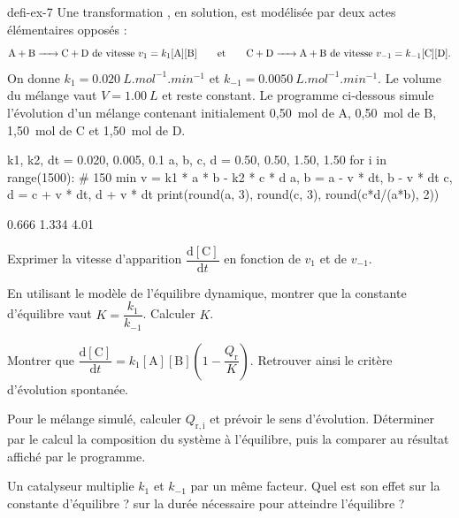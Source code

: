 \begin{blocEdition}{defi-ex-7}
Une transformation , en solution, est modélisée par deux actes élémentaires opposés :
\[\ce{A + B -> C + D}\ \text{de vitesse}\ v_1=k_1[\mathrm{A}][\mathrm{B}]\qquad\text{et}\qquad\ce{C + D -> A + B}\ \text{de vitesse}\ v_{-1}=k_{-1}[\mathrm{C}][\mathrm{D}].\]
On donne $k_1=\qty{0,020}{L.mol^{-1}.min^{-1}}$ et $k_{-1}=\qty{0,0050}{L.mol^{-1}.min^{-1}}$. Le volume du mélange vaut
$V=\qty{1,00}{L}$ et reste constant. Le programme ci-dessous simule l'évolution d'un mélange contenant initialement
0,50~mol de A, 0,50~mol de B, 1,50~mol de C et 1,50~mol de D.
\begin{codecote}[0.72]
\begin{pythoncol}
k1, k2, dt = 0.020, 0.005, 0.1
a, b, c, d = 0.50, 0.50, 1.50, 1.50
for i in range(1500):        # 150 min
    v = k1 * a * b - k2 * c * d
    a, b = a - v * dt, b - v * dt
    c, d = c + v * dt, d + v * dt
print(round(a, 3), round(c, 3), round(c*d/(a*b), 2))
\end{pythoncol}
\cote
\begin{consolecol}
0.666 1.334 4.01
\end{consolecol}
\end{codecote}
\begin{questions}
\item Exprimer la vitesse d'apparition $\dfrac{\mathrm{d}[\mathrm{C}]}{\mathrm{d}t}$ en fonction de $v_1$ et de $v_{-1}$.
\item En utilisant le modèle de l'équilibre dynamique, montrer que la constante d'équilibre vaut $K=\dfrac{k_1}{k_{-1}}$.
Calculer $K$.
\item Montrer que $\dfrac{\mathrm{d}[\mathrm{C}]}{\mathrm{d}t}=k_1[\mathrm{A}][\mathrm{B}]\left(1-\dfrac{Q_\mathrm{r}}{K}\right)$. Retrouver ainsi
le critère d'évolution spontanée.
\item Pour le mélange simulé, calculer $Q_{\mathrm{r},\mathrm{i}}$ et prévoir le sens d'évolution. Déterminer par le calcul la
composition du système à l'équilibre, puis la comparer au résultat affiché par le programme.
\item Un catalyseur multiplie $k_1$ et $k_{-1}$ par un même facteur. Quel est son effet sur la constante d'équilibre ?
sur la durée nécessaire pour atteindre l'équilibre ?
\end{questions}
\end{blocEdition}

